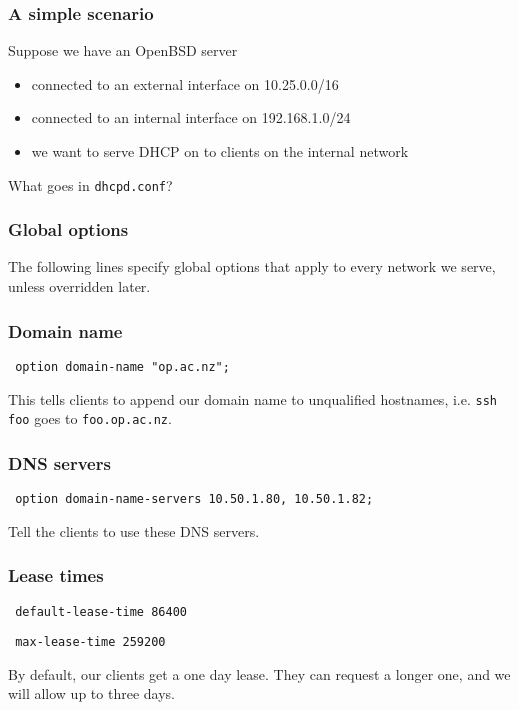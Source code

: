 \documentclass[10pt]{beamer}
\begin{document}
\begin{frame}
  \frametitle{A simple scenario}
  Suppose we have an OpenBSD server 
  \begin{itemize}
    \item connected to an external interface on 10.25.0.0/16
    \item connected to an internal interface on 192.168.1.0/24
    \item we want to serve DHCP on to clients on the internal network
  \end{itemize}  
  
  What goes in \texttt{dhcpd.conf}?
\end{frame}


\begin{frame}
  \frametitle{Global options}
  The following lines specify global options that apply to every network
  we serve, unless overridden later.
\end{frame}


\begin{frame}
  \frametitle{Domain name}
  
  \texttt{ option domain-name "op.ac.nz"; }

  This tells clients to append our domain name to unqualified hostnames, 
  i.e.  \texttt{ssh foo} goes to \texttt{foo.op.ac.nz}.
\end{frame}


\begin{frame}
  \frametitle{DNS servers}

  \texttt{ option domain-name-servers 10.50.1.80, 10.50.1.82; }

  Tell the clients to use these DNS servers.

\end{frame}


\begin{frame}
  \frametitle{Lease times}

  \texttt{ default-lease-time 86400 }
  
  \texttt{ max-lease-time 259200 }

  By default, our clients get a one day lease.  They can request a longer one,
  and we will allow up to three days.
  

\end{frame}
\end{document}
